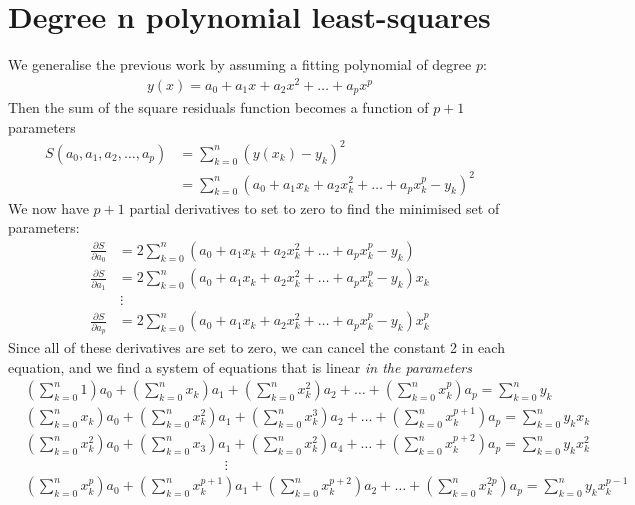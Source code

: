 \section{Degree n polynomial least-squares}
We generalise the previous work by assuming a fitting polynomial of degree $p$:
\begin{align*}
y(x) = a_0 + a_1 x + a_2 x^2 + \dots + a_p x^p
\end{align*}
Then the sum of the square residuals function becomes a function of $p+1$ parameters
\begin{align*}
S(a_0, a_1, a_2, \dots, a_p) &= \sum_{k=0}^n \left( y(x_k) - y_k \right)^2 \\
&= \sum_{k=0}^n \left( a_0 + a_1 x_k + a_2 x_k^2 + \dots + a_p x_k^p - y_k \right)^2
\end{align*}
We now have $p+1$ partial derivatives to set to zero to find the minimised set of parameters:
\begin{align*}
\frac{\partial S}{\partial a_0} &= 2\sum_{k=0}^n \left( a_0 + a_1 x_k + a_2 x_k^2 + \dots + a_p x_k^p - y_k \right) \\
\frac{\partial S}{\partial a_1} &= 2\sum_{k=0}^n \left( a_0 + a_1 x_k + a_2 x_k^2 + \dots + a_p x_k^p - y_k \right) x_k \\
 & \,\vdots \\
\frac{\partial S}{\partial a_p} &= 2\sum_{k=0}^n \left( a_0 + a_1 x_k + a_2 x_k^2 + \dots + a_p x_k^p - y_k \right)  x_k^p
\end{align*}
Since all of these derivatives are set to zero, we can cancel the constant 2 in each equation, and we find a system of equations that is linear \textit{in the parameters}
\begin{align*}
 & \left(\sum_{k=0}^n 1\right) a_0 + \left(\sum_{k=0}^n x_k\right)a_1 +  \left(\sum_{k=0}^n  x_k^2\right)a_2 + \dots + \left(\sum_{k=0}^n  x_k^p \right)a_p  =  \sum_{k=0}^n y_k \\
 & \left(\sum_{k=0}^n x_k\right) a_0 + \left(\sum_{k=0}^n x_k^2\right)a_1 +  \left(\sum_{k=0}^n  x_k^3\right)a_2 + \dots + \left(\sum_{k=0}^n  x_k^{p+1} \right)a_p  =  \sum_{k=0}^n y_k x_k \\
 & \left(\sum_{k=0}^n x_k^2\right) a_0 + \left(\sum_{k=0}^n x_3\right)a_1 +  \left(\sum_{k=0}^n  x_k^2\right)a_4 + \dots + \left(\sum_{k=0}^n  x_k^{p+2} \right)a_p  =  \sum_{k=0}^n y_k x_k^2 \\
 & \hspace{6cm} \vdots \\
 & \left(\sum_{k=0}^n x_k^{p}\right) a_0 + \left(\sum_{k=0}^n x_k^{p+1}\right)a_1 +  \left(\sum_{k=0}^n  x_k^{p+2}\right)a_2 + \dots + \left(\sum_{k=0}^n  x_k^{2p} \right)a_p  =  \sum_{k=0}^n y_k  x_k^{p-1}
\end{align*}
